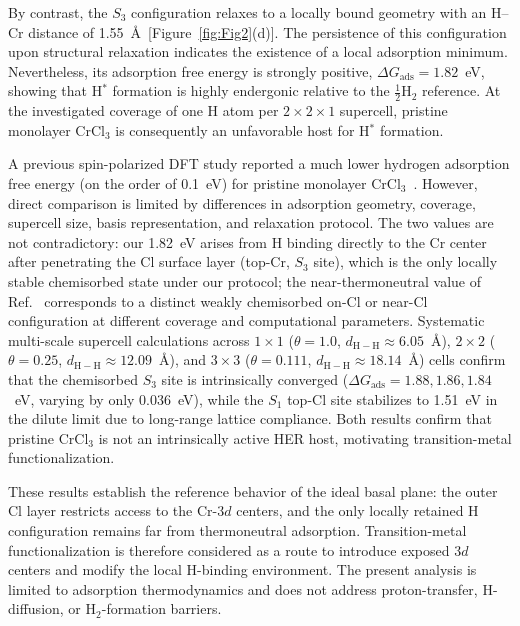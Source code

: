 \documentclass[journal=jacsat,manuscript=article]{achemso}
\begin{document}
By contrast, the $S_3$ configuration relaxes to a locally bound geometry with an H--Cr distance of 1.55~\AA\ [Figure~\ref{fig:Fig2}(d)]. The persistence of this configuration upon structural relaxation indicates the existence of a local adsorption minimum. Nevertheless, its adsorption free energy is strongly positive, $\Delta G_{\mathrm{ads}} = 1.82$~eV, showing that H$^*$ formation is highly endergonic relative to the $\frac{1}{2}$H$_2$ reference. At the investigated coverage of one H atom per $2\times2\times1$ supercell, pristine monolayer CrCl$_3$ is consequently an unfavorable host for H$^*$ formation. {\color{revcolor}%
  A previous spin-polarized DFT study reported a much lower hydrogen adsorption free energy (on the order of 0.1~eV) for pristine monolayer CrCl$_3$~\cite{Zala2024}. However, direct comparison is limited by differences in adsorption geometry, coverage, supercell size, basis representation, and relaxation protocol. The two values are not contradictory: our 1.82~eV arises from H binding directly to the Cr center after penetrating the Cl surface layer (top-Cr, $S_3$ site), which is the only locally stable chemisorbed state under our protocol; the near-thermoneutral value of Ref.~\cite{Zala2024} corresponds to a distinct weakly chemisorbed on-Cl or near-Cl configuration at different coverage and computational parameters. Systematic multi-scale supercell calculations across $1\times 1$ ($\theta = 1.0$, $d_{\mathrm{H-H}} \approx 6.05$~\AA), $2\times 2$ ($\theta = 0.25$, $d_{\mathrm{H-H}} \approx 12.09$~\AA), and $3\times 3$ ($\theta = 0.111$, $d_{\mathrm{H-H}} \approx 18.14$~\AA) cells confirm that the chemisorbed $S_3$ site is intrinsically converged ($\Delta G_{\mathrm{ads}} = 1.88, 1.86, 1.84$~eV, varying by only 0.036~eV), while the $S_1$ top-Cl site stabilizes to 1.51~eV in the dilute limit due to long-range lattice compliance. Both results confirm that pristine CrCl$_3$ is not an intrinsically active HER host, motivating transition-metal functionalization.
\par}

These results establish the reference behavior of the ideal basal plane: the outer Cl layer restricts access to the Cr-$3d$ centers, and the only locally retained H configuration remains far from thermoneutral adsorption. Transition-metal functionalization is therefore considered as a route to introduce exposed $3d$ centers and modify the local H-binding environment. The present analysis is limited to adsorption thermodynamics and does not address proton-transfer, H-diffusion, or H$_2$-formation barriers.
\end{document}
